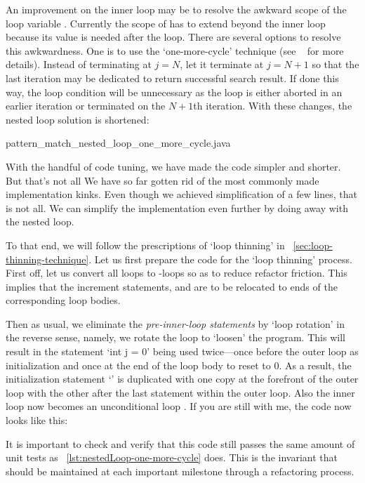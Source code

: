An improvement on the inner loop may be to resolve the awkward scope of the loop variable
.
Currently the scope of  has to extend beyond the inner loop because
its value is needed after the loop.
There are several options to resolve this awkwardness.
One is to use the `one-more-cycle' technique (see ~\pageref{sec:one-more-cycle} for more details).
Instead of terminating at $j = N$, let it terminate at $j = N+1$ so that the last
iteration may be dedicated to return successful search result.
If done this way, the loop condition will be unnecessary as the loop is
either aborted in an earlier iteration or terminated on the $N+1$th iteration.
With these changes, the nested loop solution is shortened:

{pattern_match_nested_loop_one_more_cycle.java}


With the handful of code tuning, we have made the code simpler and shorter.
But that's not all
We have so far gotten rid of the most commonly made implementation kinks.
Even though we achieved simplification of a few lines, that is not all.
We can simplify the implementation even further by doing away with the nested loop.


To that end, we will follow the prescriptions of `loop thinning' in
~\autoref{sec:loop-thinning-technique}.
Let us first prepare the code for the `loop thinning' process.
First off, let us convert all  loops to -loops so as to reduce refactor
friction.
This implies that the increment statements,  and  are to be relocated to ends
of the corresponding loop bodies.


Then as usual, we eliminate the \emph{pre-inner-loop statements} by `loop rotation' in the
reverse sense, namely, we rotate the loop to `loosen' the program.
This will result in the statement `int j = 0' being used twice---once before the outer loop as
initialization and once at the end of the loop body to reset  to 0.
As a result, the initialization statement `' is duplicated with one copy
at the forefront of the outer loop with the other after the last statement within the outer loop.
Also the inner loop now becomes an unconditional loop .
If you are still with me, the code now looks like this:

It is important to check and verify that this code still passes the same amount of
unit tests as ~\autoref{lst:nestedLoop-one-more-cycle} does.
This is the invariant that should be maintained at each important milestone
through a refactoring process.


